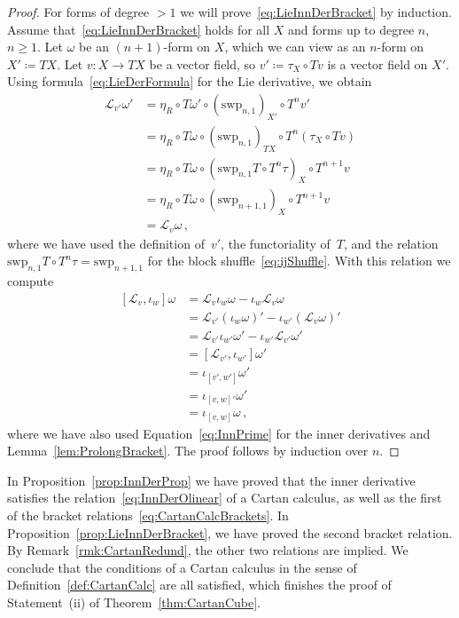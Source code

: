 \documentclass[12pt,reqno, a4paper]{amsart}
\numberwithin{equation}{section}
\theoremstyle{plain}
\theoremstyle{definition}
\theoremstyle{remark}
\newcommand{\Lie}{\mathcal{L}}
\newcommand{\Val}{\eta}
\newcommand{\Swp}{\mathrm{swp}}
\begin{document}
\begin{proof}
For forms of degree $>1$ we will prove~\eqref{eq:LieInnDerBracket} by induction. Assume that~\eqref{eq:LieInnDerBracket} holds for all $X$ and forms up to degree $n$, $n \geq 1$. Let $\omega$ be an $(n+1)$-form on $X$, which we can view as an $n$-form on $X' \coloneqq TX$. Let $v\colon X \to TX$ be a vector field, so $v' \coloneqq \tau_X \circ Tv$ is a vector field on $X'$. Using formula~\eqref{eq:LieDerFormula} for the Lie derivative, we obtain
\begin{equation*}
\begin{split}
  \Lie_{v'} \omega'
  &=
  \Val_R \circ T\omega' \circ
  (\Swp_{n,1})_{X'} \circ T^n v'
  \\
  &=
  \Val_R \circ T\omega \circ
  (\Swp_{n,1})_{TX} \circ T^n(\tau_X \circ Tv)
  \\
  &=
  \Val_R \circ T\omega \circ
  (\Swp_{n,1}T \circ T^n \tau)_X \circ T^{n+1}v
  \\
  &=
  \Val_R \circ T\omega \circ
  (\Swp_{n+1,1})_X \circ T^{n+1}v
  \\
  &= \Lie_v \omega
  \,,
\end{split}
\end{equation*}
where we have used the definition of~$v'$, the functoriality of~$T$, and the relation $\Swp_{n,1}T \circ T^n\tau = \Swp_{n+1,1}$ for the block shuffle~\eqref{eq:ijShuffle}. With this relation we compute
\begin{equation}
\label{eq:LieDerInn05}
\begin{split}
  [\Lie_v, \iota_w]\omega
  &=
  \Lie_v \iota_w \omega - \iota_w \Lie_v \omega
  \\
  &=
  \Lie_{v'} (\iota_w \omega)'
  - \iota_{w'} (\Lie_v \omega)'
  \\
  &=
  \Lie_{v'} \iota_{w'} \omega'
  - \iota_{w'} \Lie_{v'} \omega'
  \\
  &=
  [\Lie_{v'}, \iota_{w'}] \omega'
  \\
  &= \iota_{[v',w']} \omega'
  \\
  &= \iota_{[v,w]'} \omega'
  \\
  &= \iota_{[v,w]} \omega
  \,,
\end{split}
\end{equation}
where we have also used Equation~\eqref{eq:InnPrime} for the inner derivatives and Lemma~\ref{lem:ProlongBracket}. The proof follows by induction over $n$.
\end{proof}

In Proposition~\ref{prop:InnDerProp} we have proved that the inner derivative satisfies the relation~\eqref{eq:InnDerOlinear} of a Cartan calculus, as well as the first of the bracket relations~\eqref{eq:CartanCalcBrackets}. In Proposition~\ref{prop:LieInnDerBracket}, we have proved the second bracket relation. By Remark~\ref{rmk:CartanRedund}, the other two relations are implied. We conclude that the conditions of a Cartan calculus in the sense of Definition~\ref{def:CartanCalc} are all satisfied, which finishes the proof of Statement~(ii) of Theorem~\ref{thm:CartanCube}.
\end{document}
